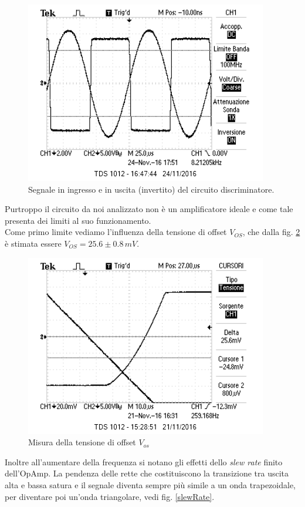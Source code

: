 \documentclass[10pt,a4paper]{article}
\begin{document}
\begin{figure}[h]
\centering
\includegraphics[scale=1.0]{immagini/discriminatore.png}
\caption{Segnale in ingresso e in uscita (invertito) del circuito discriminatore.}
\label{funzionaBene}
\end{figure}

Purtroppo il circuito da noi analizzato non è un amplificatore ideale e come tale presenta dei limiti al suo funzionamento.\\
Come primo limite vediamo l'influenza della tensione di offset $V_{OS}$, che dalla fig. \ref{Vos} è stimata essere $V_{OS} = 25.6 \pm 0.8 \, mV$.\\

\begin{figure}[h]
\centering
\includegraphics[scale=1.0]{immagini/Vos.png}
\caption{Misura della tensione di offset $V_{os}$}
\label{Vos}
\end{figure}

Inoltre all'aumentare della frequenza si notano gli effetti dello \emph{slew rate} finito dell'OpAmp. La pendenza delle rette che costituiscono la transizione tra uscita alta e bassa satura e il segnale diventa sempre più simile a un onda trapezoidale, per diventare poi un'onda triangolare, vedi fig. \ref{slewRate}.\\
\end{document}
